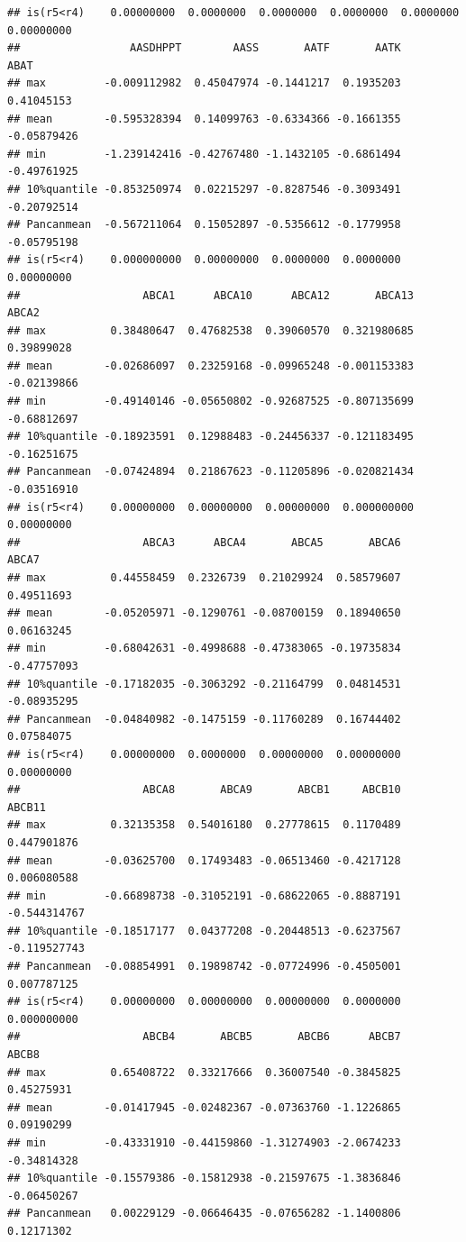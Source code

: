 \documentclass[
]{article}
\begin{document}
\begin{verbatim}
## is(r5<r4)    0.00000000  0.0000000  0.0000000  0.0000000  0.0000000  0.00000000
##                 AASDHPPT        AASS       AATF       AATK        ABAT
## max         -0.009112982  0.45047974 -0.1441217  0.1935203  0.41045153
## mean        -0.595328394  0.14099763 -0.6334366 -0.1661355 -0.05879426
## min         -1.239142416 -0.42767480 -1.1432105 -0.6861494 -0.49761925
## 10%quantile -0.853250974  0.02215297 -0.8287546 -0.3093491 -0.20792514
## Pancanmean  -0.567211064  0.15052897 -0.5356612 -0.1779958 -0.05795198
## is(r5<r4)    0.000000000  0.00000000  0.0000000  0.0000000  0.00000000
##                   ABCA1      ABCA10      ABCA12       ABCA13       ABCA2
## max          0.38480647  0.47682538  0.39060570  0.321980685  0.39899028
## mean        -0.02686097  0.23259168 -0.09965248 -0.001153383 -0.02139866
## min         -0.49140146 -0.05650802 -0.92687525 -0.807135699 -0.68812697
## 10%quantile -0.18923591  0.12988483 -0.24456337 -0.121183495 -0.16251675
## Pancanmean  -0.07424894  0.21867623 -0.11205896 -0.020821434 -0.03516910
## is(r5<r4)    0.00000000  0.00000000  0.00000000  0.000000000  0.00000000
##                   ABCA3      ABCA4       ABCA5       ABCA6       ABCA7
## max          0.44558459  0.2326739  0.21029924  0.58579607  0.49511693
## mean        -0.05205971 -0.1290761 -0.08700159  0.18940650  0.06163245
## min         -0.68042631 -0.4998688 -0.47383065 -0.19735834 -0.47757093
## 10%quantile -0.17182035 -0.3063292 -0.21164799  0.04814531 -0.08935295
## Pancanmean  -0.04840982 -0.1475159 -0.11760289  0.16744402  0.07584075
## is(r5<r4)    0.00000000  0.0000000  0.00000000  0.00000000  0.00000000
##                   ABCA8       ABCA9       ABCB1     ABCB10       ABCB11
## max          0.32135358  0.54016180  0.27778615  0.1170489  0.447901876
## mean        -0.03625700  0.17493483 -0.06513460 -0.4217128  0.006080588
## min         -0.66898738 -0.31052191 -0.68622065 -0.8887191 -0.544314767
## 10%quantile -0.18517177  0.04377208 -0.20448513 -0.6237567 -0.119527743
## Pancanmean  -0.08854991  0.19898742 -0.07724996 -0.4505001  0.007787125
## is(r5<r4)    0.00000000  0.00000000  0.00000000  0.0000000  0.000000000
##                   ABCB4       ABCB5       ABCB6      ABCB7       ABCB8
## max          0.65408722  0.33217666  0.36007540 -0.3845825  0.45275931
## mean        -0.01417945 -0.02482367 -0.07363760 -1.1226865  0.09190299
## min         -0.43331910 -0.44159860 -1.31274903 -2.0674233 -0.34814328
## 10%quantile -0.15579386 -0.15812938 -0.21597675 -1.3836846 -0.06450267
## Pancanmean   0.00229129 -0.06646435 -0.07656282 -1.1400806  0.12171302

\end{verbatim}
\end{document}
